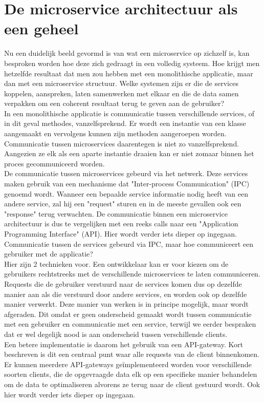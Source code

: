 \section{De microservice architectuur als een geheel}
\label{microservice-geheel}
Nu een duidelijk beeld gevormd is van wat een microservice op zichzelf is, kan besproken worden hoe deze zich gedraagt in een volledig systeem. Hoe krijgt men hetzelfde resultaat dat men zou hebben met een monolithische applicatie, maar dan met een microservice structuur. Welke systemen zijn er die de services koppelen, aanspreken, laten samenwerken met elkaar en die de data samen verpakken om een coherent resultaat terug te geven aan de gebruiker?
\\
In een monolithische applicatie is communicatie tussen verschillende services, of in dit geval methodes, vanzelfsprekend. Er wordt een instantie van een klasse aangemaakt en vervolgens kunnen zijn methoden aangeroepen worden. Communicatie tussen microservices daarentegen is niet zo vanzelfsprekend. Aangezien ze elk als een aparte instantie draaien kan er niet zomaar binnen het proces gecommuniceerd worden. 
\\
De communicatie tussen microservices gebeurd via het netwerk. Deze services maken gebruik van een mechanisme dat "Inter-process Communication" (IPC) genoemd wordt. Wanneer een bepaalde service informatie nodig heeft van een andere service, zal hij een "request" sturen en in de meeste gevallen ook een "response" terug verwachten. De communicatie binnen een microservice architectuur is dus te vergelijken met een reeks calls naar een "Application Programming Interface" (API). Hier wordt verder iets dieper op ingegaan.
\\
Communicatie tussen de services gebeurd via IPC, maar hoe communiceert een gebruiker met de applicatie?
\\
Hier zijn 2 technieken voor. Een ontwikkelaar kan er voor kiezen om de gebruikers rechtstreeks met de verschillende microservices te laten communiceren. Requests die de gebruiker verstuurd naar de services komen dus op dezelfde manier aan als die verstuurd door andere services, en worden ook op dezelfde manier verwerkt. Deze manier van werken is in principe mogelijk, maar wordt afgeraden. Dit omdat er geen onderscheid gemaakt wordt tussen communicatie met een gebruiker en communicatie met een service, terwijl we eerder bespraken dat er wel degelijk nood is aan onderscheid tussen verschillende clients.
\\
Een betere implementatie is daarom het gebruik van een API-gateway. Kort beschreven is dit een centraal punt waar alle requests van de client binnenkomen. Er kunnen meerdere API-gateways geïmplementeerd worden voor verschillende soorten clients, die de opgevraagde data elk op een specifieke manier behandelen om de data te optimaliseren alvorens ze terug naar de client gestuurd wordt. Ook hier wordt verder iets dieper op ingegaan.
